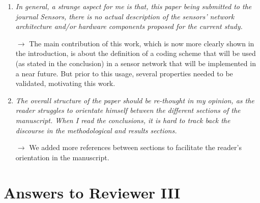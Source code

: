 \documentclass[10pt]{article}
\begin{document}
\begin{enumerate}
\item \emph{In general, a strange aspect for me is that, this paper being submitted to the journal Sensors, there is no actual description of the sensors’ network architecture and/or hardware components proposed for the current study.}

$\rightarrow$ The main contribution of this work, which is now more clearly shown in the introduction, is about the definition of a coding scheme that will be used (as stated in the conclusion) in a sensor network that will be implemented in a near future. But prior to this usage, several properties needed to be validated, motivating this work.

\item \emph{The overall structure of the paper should be re-thought in my opinion, as the reader struggles to orientate himself between the different sections of the manuscript. When I read the conclusions, it is hard to track back the discourse in the methodological and results sections.}

$\rightarrow$ We added more references between sections to facilitate the reader's orientation in the manuscript.

\end{enumerate}


\section{Answers to Reviewer III}
\end{document}
